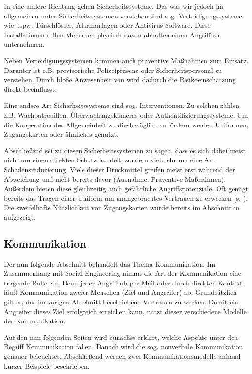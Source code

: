 In eine andere Richtung gehen Sicherheitssysteme. Das was wir jedoch im allgemeinen unter Sicherheitssystemen verstehen sind sog. Verteidigungssysteme wie bspw. Türschlösser, Alarmanlagen oder Antivirus-Software.
Diese Installationen sollen Menschen physisch davon abhalten einen Angriff zu unternehmen.

Neben Verteidigungssystemen kommen auch präventive Maßnahmen zum Einsatz.
Darunter ist z.B. provisorische Polizeipräsenz oder Sicherheitspersonal zu verstehen.
Durch bloße Anwesenheit von wird dadurch die Risikoeinschätzung direkt beeinflusst.

Eine andere Art Sicherheitssysteme sind sog. Interventionen. Zu solchen zählen z.B. Wachpatrouillen, Überwachungskameras oder Authentifizierungssysteme.
Um die Kooperation der Allgemeinheit zu diesbezüglich zu fördern werden Uniformen, Zugangskarten oder ähnliches genutzt.
\citep{liars-and-outliers}

Abschließend sei zu diesen Sicherheitssystemen zu sagen, dass es sich dabei meist nicht um einen direkten Schutz handelt, sondern vielmehr um eine Art Schadensreduzierung.
Viele dieser Druckmittel greifen meist erst während der Abweichung und nicht bereits davor (Ausnahme: Präventive Maßnahmen).
Außerdem bieten diese  gleichzeitig auch gefährliche Angriffspotenziale.
Oft genügt bereits das Tragen einer Uniform um unangebrachtes Vertrauen zu erwecken (s. ). Die zweifelhafte Nützlichkeit von Zugangskarten würde bereits im Abschnitt  in  aufgezeigt.

\subsection{Kommunikation}\label{sec:kommunikation}

Der nun folgende Abschnitt behandelt das Thema Kommunikation.
Im Zusammenhang mit Social Engineering nimmt die Art der Kommunikation eine tragende Rolle ein.
Denn jeder Angriff ob per Mail oder durch direkten Kontakt läuft Kommunikation zweier Menschen (Ziel und Angreifer) ab.
Grundsätzlich gilt es, das im vorigen Abschnitt beschriebene Vertrauen zu wecken.
Damit ein Angreifer dieses Ziel erfolgreich erreichen kann, nutzt dieser verschiedene Modelle der Kommunikation.

Auf den nun folgenden Seiten wird zunächst erklärt, welche Aspekte unter den Begriff Kommunikation fallen.
Danach wird die sog. nonverbale Kommunikation genauer beleuchtet.
Abschließend werden zwei Kommunikationsmodelle anhand kurzer Beispiele beschrieben.

